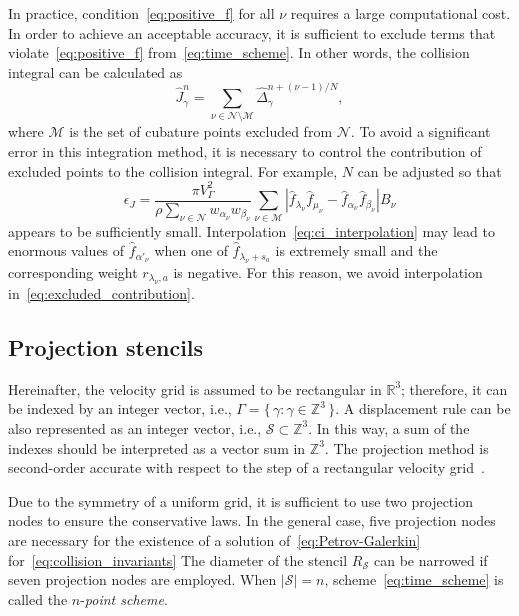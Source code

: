 \documentclass[10pt]{article}
\newcommand{\Nu}{\mathcal{N}}
\newcommand{\Mu}{\mathcal{M}}
\newcommand{\Set}[2]{\{\,{#1}:{#2}\,\}}
\begin{document}
In practice, condition~\eqref{eq:positive_f} for all \(\nu\) requires a large computational cost.
In order to achieve an acceptable accuracy, it is sufficient to exclude terms
that violate~\eqref{eq:positive_f} from~\eqref{eq:time_scheme}.
In other words, the collision integral can be calculated as
\begin{equation}\label{eq:discrete_short_ci_discarded}
    \hat{J}_\gamma^n = \sum_{\nu\in\Nu\setminus\Mu} \hat{\Delta}_\gamma^{n+(\nu-1)/N},
\end{equation}
where \(\Mu\) is the set of cubature points excluded from \(\Nu\).
To avoid a significant error in this integration method,
it is necessary to control the contribution of excluded points to the collision integral.
For example, \(N\) can be adjusted so that
\begin{equation}\label{eq:excluded_contribution}
    \epsilon_J = \frac{\pi V_\Gamma^2}{\rho\sum_{\nu\in\Nu} w_{\alpha_\nu}w_{\beta_\nu}}
        \sum_{\nu\in\Mu} \left|
            \hat{f}_{\lambda_\nu}\hat{f}_{\mu_\nu} - \hat{f}_{\alpha_\nu}\hat{f}_{\beta_\nu}
        \right|B_\nu
\end{equation}
appears to be sufficiently small.
Interpolation~\eqref{eq:ci_interpolation} may lead to enormous values of \(\hat{f}_{\alpha'_\nu}\) when
one of \(\hat{f}_{\lambda_\nu+s_a}\) is extremely small and the corresponding weight \(r_{\lambda_\nu,a}\) is negative.
For this reason, we avoid interpolation in~\eqref{eq:excluded_contribution}.

\subsection{Projection stencils}

Hereinafter, the velocity grid is assumed to be rectangular in \(\mathbb{R}^3\);
therefore, it can be indexed by an integer vector, i.e., \(\Gamma = \Set{\gamma}{\gamma\in\mathbb{Z}^3}\).
A displacement rule can be also represented as an integer vector, i.e., \(\mathcal{S}\subset\mathbb{Z}^3\).
In this way, a sum of the indexes should be interpreted as a vector sum in \(\mathbb{Z}^3\).
The projection method is second-order accurate with respect to the step of a rectangular velocity grid~\cite{Anikin2012}.

Due to the symmetry of a uniform grid,
it is sufficient to use two projection nodes to ensure the conservative laws.
In the general case, five projection nodes are necessary for the existence of
a solution of~\eqref{eq:Petrov-Galerkin} for~\eqref{eq:collision_invariants}
The diameter of the stencil \(R_\mathcal{S}\) can be narrowed if seven projection nodes are employed.
When \(|\mathcal{S}|=n\), scheme~\eqref{eq:time_scheme} is called the \(n\)-\emph{point scheme}.
\end{document}
